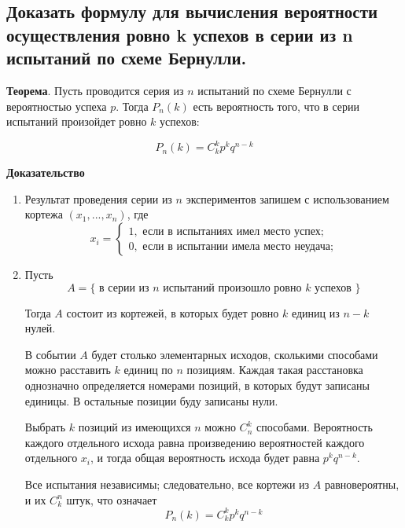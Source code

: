 \subsection{Доказать формулу для вычисления вероятности осуществления ровно k успехов в серии из n испытаний по схеме Бернулли.}

\textbf{Теорема}. Пусть проводится серия из $n$ испытаний по схеме Бернулли с вероятностью успеха $p$. Тогда $P_{n}(k)$ есть вероятность того, что в серии испытаний произойдет ровно $k$ успехов:

\begin{equation}
	P_{n}(k) = C_{k}^{k} p^{k} q^{n - k}
\end{equation}

\textbf{Доказательство}
\begin{enumerate}
	\item Результат проведения серии из $n$ экспериментов запишем с использованием кортежа $(x_{1}, ... , x_{n})$, где
	\begin{equation}
		x_{i} = 
		\begin{cases}
			1, \text{ если в испытаниях имел место успех;}\\
			0, \text{ если в испытании имела место неудача;}
		\end{cases}
	\end{equation}
	\item Пусть
	\begin{equation}
		A = \{ \text{ в серии из } n \text{ испытаний произошло ровно } k \text{ успехов }\}
	\end{equation}


	Тогда $A$ состоит из кортежей, в которых будет ровно $k$ единиц из $n-k$ нулей.
	
	В событии $A$ будет столько элементарных исходов, сколькими способами можно расставить $k$ единиц по $n$ позициям. Каждая такая расстановка однозначно определяется номерами позиций, в которых будут записаны единицы. В остальные позиции буду записаны нули.
	
	Выбрать $k$ позиций из имеющихся $n$ можно $C_{n}^{k}$ способами. Вероятность каждого отдельного исхода равна произведению вероятностей каждого отдельного
	$x_{i}$, и тогда общая вероятность исхода будет равна $p^{k} q^{n - k}$. 
	
	Все испытания независимы; следовательно, все кортежи из $A$ равновероятны,	и их $C_{k}^{n}$ штук, что означает
	\begin{equation}
		P_{n}(k) = C_{k}^{k} p^{k} q^{n - k}
	\end{equation}
\end{enumerate}